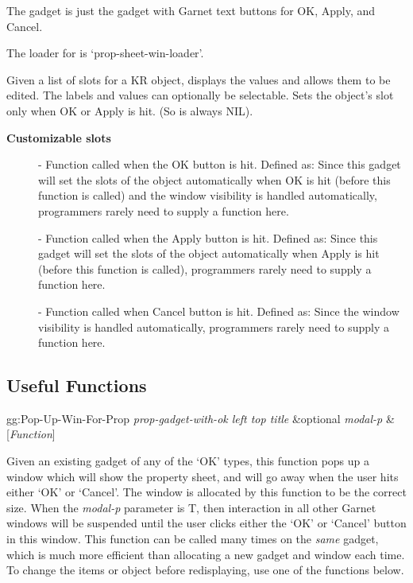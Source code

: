 The  gadget is just the
 gadget with Garnet text buttons for OK, Apply,
and Cancel.

The loader for  is `prop-sheet-win-loader'.

Given a list of slots for a KR object, displays the values and
allows them to be edited.  The labels and values can optionally be selectable.
Sets the object's slot only when OK or Apply is hit.  (So
 is always NIL).

{\bf Customizable slots}

\begin{description}
\item[]  - Function called when the OK button is hit.  Defined as:
Since this gadget will set the slots of the object automatically when
OK is hit (before this function is called) and the window
visibility is handled automatically, programmers
rarely need to supply a function here.

\item[]  - Function called when the Apply button is hit.
Defined as:
Since this gadget will set the slots of the object automatically when
Apply is hit (before this function is called), programmers
rarely need to supply a function here.

\item[]  - Function called when Cancel button is hit.  Defined as:
  Since
the window visibility is handled automatically, programmers
rarely need to supply a function here.

\end{description}



\subsection{Useful Functions}

\begin{programexample}
gg:Pop-Up-Win-For-Prop {\it prop-gadget-with-ok left top title} \&optional {\it modal-p} & [{\it Function}]
\end{programexample}
Given an existing gadget of any of the `OK' types, this function pops
up a window which will show the
property sheet, and will go away when the user hits either `OK' or
`Cancel'.  The window is allocated by this function to be the correct
size.  When the {\it modal-p} parameter is T, then interaction in all other
Garnet windows will be suspended until the user clicks either the `OK' or
`Cancel' button in this window.  This function can be called many times on the
{\it same} gadget, which is much more efficient than allocating a new gadget and
window each time.  To change the items or object before redisplaying, use one
of the functions below.

